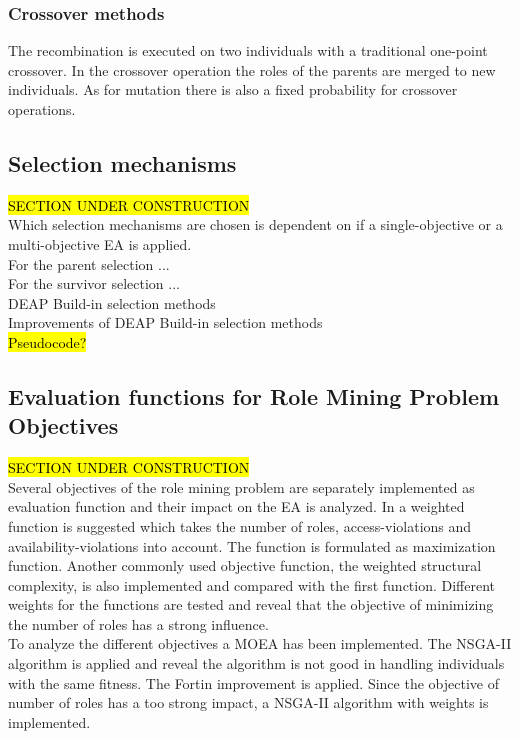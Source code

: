         \subsubsection{Crossover methods}
        The recombination is executed on two individuals with a traditional one-point crossover. In the crossover operation the roles of the parents are merged to new individuals. As for mutation there is also a fixed probability for crossover operations.
        
    \subsection{Selection mechanisms}
    \hl{SECTION UNDER CONSTRUCTION}\\
    Which selection mechanisms are chosen is dependent on if a single-objective or a multi-objective EA is applied.\\
    For the parent selection ...\\
    For the survivor selection ...\\
    DEAP Build-in selection methods\\
    Improvements of DEAP Build-in selection methods\\
    \hl{Pseudocode?}
    
    \subsection{Evaluation functions for Role Mining Problem Objectives}
    \hl{SECTION UNDER CONSTRUCTION}\\
    Several objectives of the role mining problem are separately implemented as evaluation function and their impact on the EA is analyzed. In \cite{saenko2012design} a weighted function is suggested which takes the number of roles, access-violations and availability-violations into account. The function is formulated as maximization function. Another commonly used objective function, the weighted structural complexity, is also implemented and compared with the first function. Different weights for the functions are tested and reveal that the objective of minimizing the number of roles has a strong influence.\\
    To analyze the different objectives a MOEA has been implemented. The NSGA-II algorithm is applied and reveal the algorithm is not good in handling individuals with the same fitness. The Fortin improvement is applied. Since the objective of number of roles has a too strong impact, a NSGA-II algorithm with weights is implemented.\\
    
